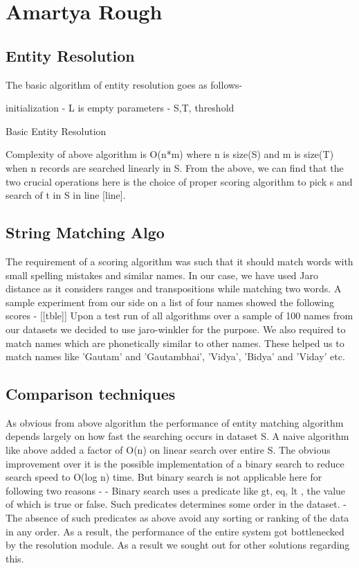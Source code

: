 \chapter{Amartya Rough}

\section{Entity Resolution}
The basic algorithm of entity resolution goes as follows-

\begin{algorithm}[H]
initialization - L is empty \;
parameters - S,T, threshold \;
 \caption{Basic Entity Resolution}
\end{algorithm}

Complexity of above algorithm is O(n*m) where n is size(S) and m is size(T) when n records are searched linearly in S.
        From the above, we can find that the two crucial operations here is the choice of proper scoring algorithm to pick s and search of t in S in line [line].

\section{String Matching Algo}
        The requirement of a scoring algorithm was such that it should match words with small spelling mistakes and similar names. In our case, we have used Jaro distance as it considers ranges and transpositions while matching two words. A sample experiment from our side on a list of four names showed the following scores - 
        [[tble]]
        Upon a test run of all algorithms over a sample of 100 names from our datasets we decided to use jaro-winkler for the purpose. We also required to match names which are phonetically similar to other names. These helped us to match names like 'Gautam' and 'Gautambhai', 'Vidya', 'Bidya' and 'Viday' etc.

\section{Comparison techniques}
        As obvious from above algorithm the performance of entity matching algorithm depends largely on how fast the searching occurs in dataset S. A naive algorithm like above added a factor of O(n) on linear search over entire S. The obvious improvement over it is the possible implementation of a binary search to reduce search speed to O(log n) time. But binary search is not applicable here for following two reasons -
            - Binary search uses a predicate like gt, eq, lt , the value of which is true or false. Such predicates determines some order in the dataset. 
            - The absence of such predicates as above avoid any sorting or ranking of the data in any order.
        As a result, the performance of the entire system got bottlenecked by the resolution module. As a result we sought out for other solutions regarding this.

